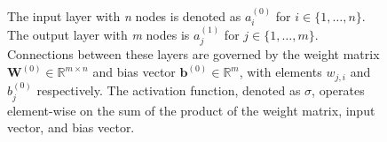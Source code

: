 \begin{figure}
{\begin{tikzpicture}[x=2.7cm,y=1.6cm]
\end{tikzpicture}
}
\caption[Activation function.]{\small{The input layer with \textit{n} nodes is denoted as $a_i^{(0)}$ for $i \in \{1, \ldots, n\}$. The output layer with \textit{m} nodes is $a_j^{(1)}$ for $j \in \{1, \ldots, m\}$. Connections between these layers are governed by the weight matrix $\mathbf{W}^{(0)} \in \mathbb{R}^{m\times n}$ and bias vector $\mathbf{b}^{(0)} \in \mathbb{R}^{m}$, with elements $w_{j,i}$ and $b_j^{(0)}$ respectively. The activation function, denoted as $\sigma$, operates element-wise on the sum of the product of the weight matrix, input vector, and bias vector.}}


    \label{fig:activation_function}

\end{figure}